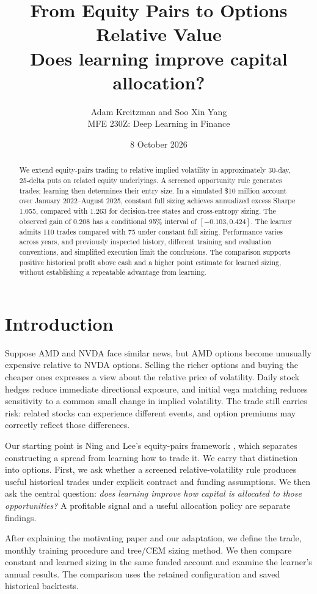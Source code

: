 \documentclass[11pt,letterpaper]{article}
\title{\textbf{From Equity Pairs to Options Relative Value}\\[0.4em]
\large Does learning improve capital allocation?}
\author{Adam Kreitzman and Soo Xin Yang\\MFE 230Z: Deep Learning in Finance}
\date{8 October 2026}
\newcommand{\money}[1]{\$#1}
\begin{document}
\maketitle
\begin{abstract}
We extend equity-pairs trading to relative implied volatility in approximately
30-day, 25-delta puts on related equity underlyings. A screened opportunity rule generates
trades; learning then determines their entry size. In a simulated \money{10 million}
account over January 2022--August 2025, constant full sizing achieves annualized
excess Sharpe 1.055, compared with 1.263 for decision-tree states and cross-entropy
sizing. The observed gain of 0.208 has a conditional 95\% interval of
$[-0.103,0.424]$. The learner admits 110 trades compared with 75 under constant
full sizing. Performance varies across years, and previously inspected history,
different training and evaluation conventions, and simplified execution limit
the conclusions. The comparison supports positive historical profit above cash
and a higher point estimate for learned sizing, without establishing a repeatable
advantage from learning.
\end{abstract}

\section{Introduction}
Suppose AMD and NVDA face similar news, but AMD options become unusually expensive
relative to NVDA options. Selling the richer options and buying the cheaper ones
expresses a view about the relative price of volatility. Daily stock hedges reduce
immediate directional exposure, and initial vega matching reduces sensitivity to
a common small change in implied volatility. The trade still carries risk:
related stocks can experience different events, and option premiums may correctly
reflect those differences.

Our starting point is Ning and Lee's equity-pairs framework \cite{ning}, which
separates constructing a spread from learning how to trade it. We carry that
distinction into options. First, we ask whether a screened relative-volatility
rule produces useful historical trades under explicit contract and funding
assumptions. We then ask the central question: \emph{does learning improve how
capital is allocated to those opportunities?} A profitable signal and a useful
allocation policy are separate findings.

After explaining the motivating paper and our adaptation, we define the trade,
monthly training procedure and tree/CEM sizing method. We then compare constant
and learned sizing in the same funded account and examine the learner's annual
results. The comparison uses the retained configuration and saved historical
backtests.
\end{document}
